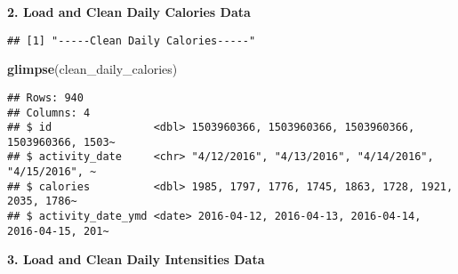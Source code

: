 \documentclass[
]{article}
\newenvironment{Shaded}{\begin{snugshade}}{\end{snugshade}}
\newcommand{\AttributeTok}[1]{\textcolor[rgb]{0.13,0.29,0.53}{#1}}
\newcommand{\CommentTok}[1]{\textcolor[rgb]{0.56,0.35,0.01}{\textit{#1}}}
\newcommand{\FunctionTok}[1]{\textcolor[rgb]{0.13,0.29,0.53}{\textbf{#1}}}
\newcommand{\NormalTok}[1]{#1}
\newcommand{\OtherTok}[1]{\textcolor[rgb]{0.56,0.35,0.01}{#1}}
\newcommand{\SpecialCharTok}[1]{\textcolor[rgb]{0.81,0.36,0.00}{\textbf{#1}}}
\newcommand{\StringTok}[1]{\textcolor[rgb]{0.31,0.60,0.02}{#1}}
\begin{document}
\textbf{2. Load and Clean Daily Calories Data}

\begin{Shaded}
\end{Shaded}

\begin{verbatim}
## [1] "-----Clean Daily Calories-----"
\end{verbatim}

\begin{Shaded}
\begin{Highlighting}[]
\FunctionTok{glimpse}\NormalTok{(clean\_daily\_calories)}
\end{Highlighting}
\end{Shaded}

\begin{verbatim}
## Rows: 940
## Columns: 4
## $ id                <dbl> 1503960366, 1503960366, 1503960366, 1503960366, 1503~
## $ activity_date     <chr> "4/12/2016", "4/13/2016", "4/14/2016", "4/15/2016", ~
## $ calories          <dbl> 1985, 1797, 1776, 1745, 1863, 1728, 1921, 2035, 1786~
## $ activity_date_ymd <date> 2016-04-12, 2016-04-13, 2016-04-14, 2016-04-15, 201~
\end{verbatim}

\textbf{3. Load and Clean Daily Intensities Data}
\end{document}
